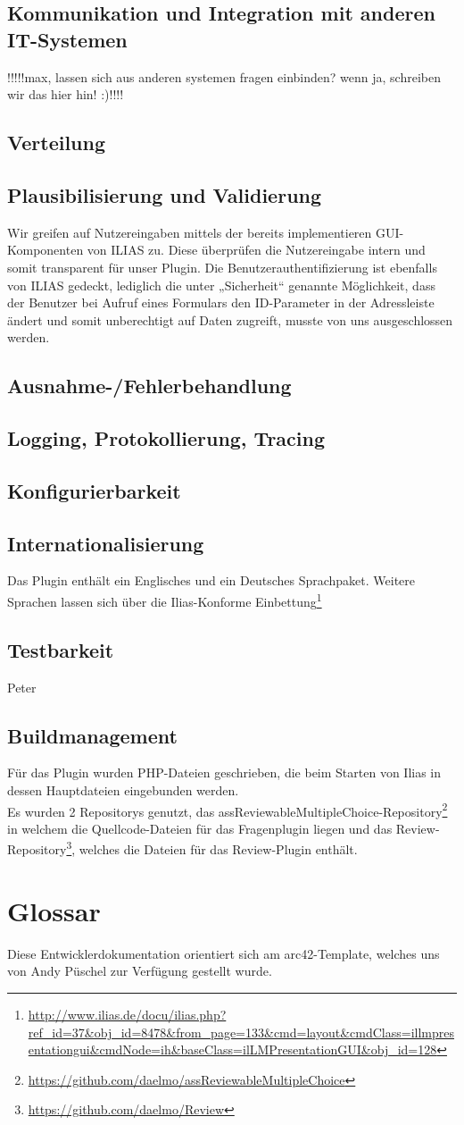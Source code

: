 \documentclass[a4paper]{scrreprt}
\begin{document}
\section{Kommunikation und Integration mit anderen IT-Systemen}
!!!!!max, lassen sich aus anderen systemen fragen einbinden? wenn ja, schreiben wir das hier hin! :)!!!!
\section{Verteilung}
\section{Plausibilisierung und Validierung}
Wir greifen auf Nutzereingaben mittels der bereits implementieren GUI-Komponenten von ILIAS zu. Diese überprüfen die Nutzereingabe intern und somit transparent für unser Plugin. Die Benutzerauthentifizierung ist ebenfalls von ILIAS gedeckt, lediglich die unter „Sicherheit“ genannte Möglichkeit, dass der Benutzer bei Aufruf eines Formulars den ID-Parameter in der Adressleiste ändert und somit unberechtigt auf Daten zugreift, musste von uns ausgeschlossen werden.
\section{Ausnahme-/Fehlerbehandlung}
\section{Logging, Protokollierung, Tracing}
\section{Konfigurierbarkeit}
\section{Internationalisierung}
Das Plugin enthält ein Englisches und ein Deutsches Sprachpaket. Weitere Sprachen lassen sich über die Ilias-Konforme Einbettung\footnote{\url{http://www.ilias.de/docu/ilias.php?ref_id=37&obj_id=8478&from_page=133&cmd=layout&cmdClass=illmpresentationgui&cmdNode=ih&baseClass=ilLMPresentationGUI&obj_id=128}} 
 
\section{Testbarkeit}
Peter
\section{Buildmanagement}
Für das Plugin wurden PHP-Dateien geschrieben, die beim Starten von Ilias in dessen Hauptdateien eingebunden werden.\\
Es wurden 2 Repositorys genutzt, das assReviewableMultipleChoice-Repository\footnote{\url{https://github.com/daelmo/assReviewableMultipleChoice}} in welchem die Quellcode-Dateien für das Fragenplugin liegen und das Review-Repository\footnote{\url{https://github.com/daelmo/Review}}, welches die Dateien für das Review-Plugin enthält.

\chapter{Glossar}
Diese Entwicklerdokumentation orientiert sich am arc42-Template, welches uns von Andy Püschel zur Verfügung gestellt wurde.
\end{document}
